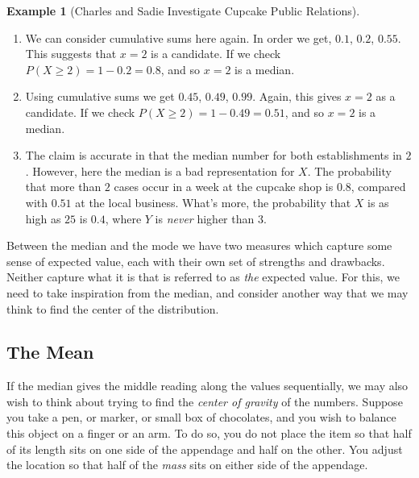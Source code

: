 \documentclass[
  letterpaper,
  DIV=11,
  numbers=noendperiod]{scrreprt}
\theoremstyle{definition}
\theoremstyle{definition}
\theoremstyle{definition}
\newtheorem{example}{Example}[chapter]
\theoremstyle{remark}
\begin{document}
\begin{example}[Charles and Sadie Investigate Cupcake Public
Relations]
\begin{tcolorbox}[enhanced jigsaw, colback=white, breakable, rightrule=.15mm, leftrule=.75mm, toprule=.15mm, left=2mm, arc=.35mm, opacityback=0, bottomrule=.15mm]
\begin{enumerate}
\def\labelenumi{\alph{enumi}.}
\item
  We can consider cumulative sums here again. In order we get, \(0.1\),
  \(0.2\), \(0.55\). This suggests that \(x=2\) is a candidate. If we
  check \(P(X \geq 2) = 1 - 0.2 = 0.8\), and so \(x=2\) is a median.
\item
  Using cumulative sums we get \(0.45\), \(0.49\), \(0.99\). Again, this
  gives \(x=2\) as a candidate. If we check
  \(P(X \geq 2) = 1 - 0.49 = 0.51\), and so \(x=2\) is a median.
\item
  The claim is accurate in that the median number for both
  establishments in \(2\). However, here the median is a bad
  representation for \(X\). The probability that more than \(2\) cases
  occur in a week at the cupcake shop is \(0.8\), compared with \(0.51\)
  at the local business. What's more, the probability that \(X\) is as
  high as \(25\) is \(0.4\), where \(Y\) is \emph{never} higher than
  \(3\).
\end{enumerate}

\end{tcolorbox}

\end{example}

Between the median and the mode we have two measures which capture some
sense of expected value, each with their own set of strengths and
drawbacks. Neither capture what it is that is referred to as \emph{the}
expected value. For this, we need to take inspiration from the median,
and consider another way that we may think to find the center of the
distribution.

\subsection{The Mean}\label{the-mean}

If the median gives the middle reading along the values sequentially, we
may also wish to think about trying to find the \emph{center of gravity}
of the numbers. Suppose you take a pen, or marker, or small box of
chocolates, and you wish to balance this object on a finger or an arm.
To do so, you do not place the item so that half of its length sits on
one side of the appendage and half on the other. You adjust the location
so that half of the \emph{mass} sits on either side of the appendage.
\end{document}

